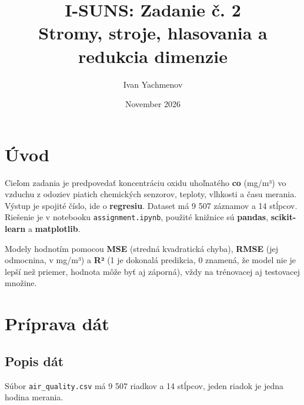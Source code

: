 \documentclass[11pt,a4paper]{article}
\title{I-SUNS: Zadanie č. 2 \\ Stromy, stroje, hlasovania a redukcia dimenzie}
\author{Ivan Yachmenov}
\date{November 2026}
\begin{document}
\maketitle

\section*{Úvod}
Cieľom zadania je predpovedať koncentráciu oxidu uhoľnatého \textbf{co} (mg/m³) vo vzduchu z odoziev piatich
chemických senzorov, teploty, vlhkosti a času merania. Výstup je spojité číslo, ide o \textbf{regresiu}.
Dataset má 9 507 záznamov a 14 stĺpcov. Riešenie je v notebooku \texttt{assignment.ipynb}, použité knižnice
sú \textbf{pandas}, \textbf{scikit-learn} a \textbf{matplotlib}.

Modely hodnotím pomocou \textbf{MSE} (stredná kvadratická chyba), \textbf{RMSE} (jej odmocnina, v mg/m³)
a \textbf{R²} (1 je dokonalá predikcia, 0 znamená, že model nie je lepší než priemer, hodnota môže byť aj záporná),
vždy na trénovacej aj testovacej množine.

\section{Príprava dát}

\subsection{Popis dát}
Súbor \texttt{air\_quality.csv} má 9 507 riadkov a 14 stĺpcov, jeden riadok je jedna hodina merania.
\end{document}
